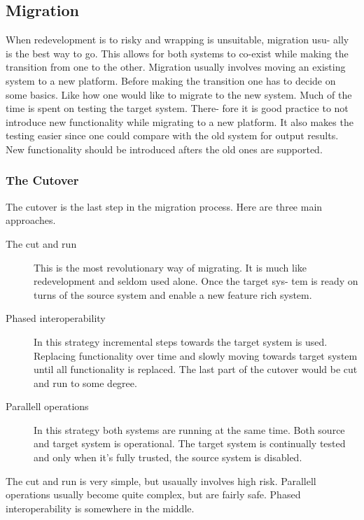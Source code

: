 \subsection{Migration}
When redevelopment is to risky and wrapping is unsuitable, migration usu-
ally is the best way to go. This allows for both systems to co-exist while
making the transition from one to the other. Migration usually involves
moving an existing system to a new platform. Before making the transition
one has to decide on some basics. Like how one would like to migrate to the
new system. Much of the time is spent on testing the target system. There-
fore it is good practice to not introduce new functionality while migrating to
a new platform. It also makes the testing easier since one could compare with
the old system for output results. New functionality should be introduced
afters the old ones are supported.

\subsubsection{The Cutover}
The cutover is the last step in the migration process. 
Here are three main approaches.

\begin{description}
\item[The cut and run] This is the most revolutionary way of migrating. It is
much like redevelopment and seldom used alone. Once the target sys-
tem is ready on turns of the source system and enable a new feature
rich system.

\item[Phased interoperability] In this strategy incremental steps towards the
target system is used. Replacing functionality over time and slowly
moving towards target system until all functionality is replaced. The
last part of the cutover would be cut and run to some degree.

\item[Parallell operations] In this strategy both systems are running at the same
time. Both source and target system is operational. The target system
is continually tested and only when it's fully trusted, the source system
is disabled.
\end{description}

The cut and run is very simple, but usaually involves high risk. Parallell
operations usually become quite complex, but are fairly safe. Phased interoperability is somewhere in the middle.

\cite{leg:jdbj}



